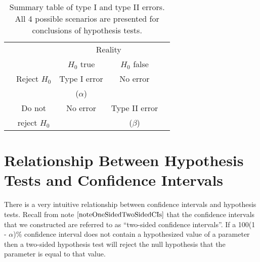 \renewcommand{\arraystretch}{1.20}
\begin{table}[H]
\label{tableHypTestSummary}
\parbox{15cm}{
\hspace*{-2.250cm}
  	\centering
  	\begin{tabular}{l  l  c |c|  c}
								& 					& \multicolumn{2}{c}{Reality}	\\[0.5em]
	\cline{3-4}
{\multirow{5}{*}{Conclusion from } }		& \multicolumn{1}{c|}{}	& \multicolumn{1}{c|}{ $H_{0}$ true } 	 & $H_{0}$ false 	\\ 
	\cline{2-4}
{\multirow{5}{*}{{\vspace*{0.2cm}{hypothesis test}}}}		&	\multicolumn{1}{|c|}{Reject $H_{0}$}	& Type I error		&	No error	 	\\ 

								&	\multicolumn{1}{|c|}{}	&		($\alpha$)				&				\\

	\cline{2-4}
&	\multicolumn{1}{|c|}{Do not}  		& 	No error			&	Type II error	 \\ 
&	\multicolumn{1}{|c|}{reject $H_{0}$}	&					&	($\beta$)		\\ 
	\cline{2-4}
\end{tabular}
\caption{	Summary table of type I and type II errors.
		All 4 possible scenarios are presented for conclusions of hypothesis tests.}
}
\end{table}













\section{Relationship Between Hypothesis Tests and  Confidence Intervals}

There is a very intuitive relationship between confidence intervals and hypothesis tests. Recall from note $\ref{noteOneSidedTwoSidedCIs}$ that the confidence intervals that we constructed are referred to as ``two-sided confidence intervals''. If a 100(1 - $\alpha$)\% confidence interval does not contain a hypothesized value of a parameter then a two-sided hypothesis test will reject the null hypothesis that the parameter is equal to that value.



